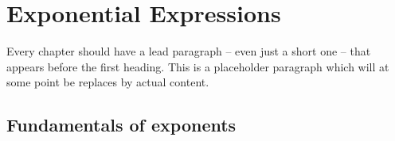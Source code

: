\chapter{Exponential Expressions}
\label{ch:expoexpr}



Every chapter should have a lead paragraph -- even just a short one -- that appears before the first heading. This is a placeholder paragraph which will at some point be replaces by actual content.

\section{Fundamentals of exponents}
\label{sec:exposimpform}


